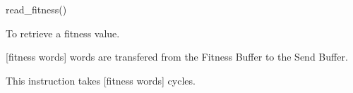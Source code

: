 

\format
read\_fitness()

\purpose

To retrieve a fitness value.

\description

[fitness words] words are transfered from the Fitness Buffer to the Send Buffer.

\notes

This instruction takes [fitness words] cycles.
